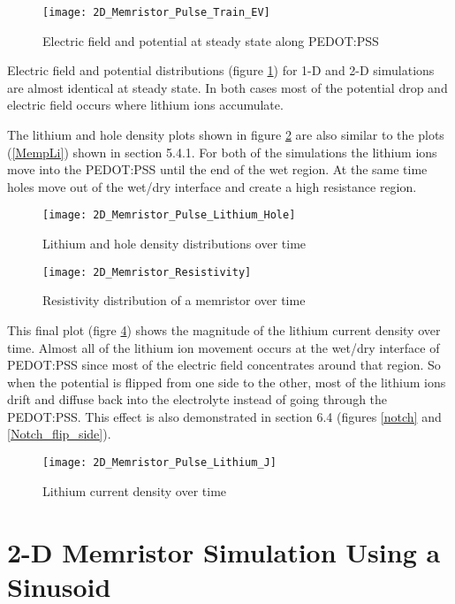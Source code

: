\begin{doublespace}
\begin{figure}[!htp]
\centering
\texttt{[image: 2D\_Memristor\_Pulse\_Train\_EV]}
\caption{Electric field and potential at steady state along PEDOT:PSS} 
\label{2D_E_V_ss}
\end{figure}

Electric field and potential distributions (figure \ref{2D_E_V_ss}) for 1-D and 2-D simulations are almost identical at steady state. In both cases most of the potential drop and electric field occurs where lithium ions accumulate.

The lithium and hole density plots shown in figure \ref{lit_hole_dist} are also similar to the plots (\ref{MempLi}) shown in section 5.4.1. For both of the simulations the lithium ions move into the PEDOT:PSS until the end of the wet region. At the same time holes move out of the wet/dry interface and create a high resistance region.

\begin{figure}[!htp]
\centering
\texttt{[image: 2D\_Memristor\_Pulse\_Lithium\_Hole]}
\caption{Lithium and hole density distributions over time} 
\label{lit_hole_dist}
\end{figure}

\begin{figure}[!htp]
\centering
\texttt{[image: 2D\_Memristor\_Resistivity]}
\caption{Resistivity distribution of a memristor over time} 
\label{2dres}
\end{figure}

This final plot (figre \ref{mag_lit_curr}) shows the magnitude of the lithium current density over time. Almost all of the lithium ion movement occurs at the wet/dry interface of PEDOT:PSS since most of the electric field concentrates around that region. So when the potential is flipped from one side to the other, most of the lithium ions drift and diffuse back into the electrolyte instead of going through the PEDOT:PSS. This effect is also demonstrated in section 6.4 (figures \ref{notch} and \ref{Notch_flip_side}). 

\begin{figure}[!htp]
\centering
\texttt{[image: 2D\_Memristor\_Pulse\_Lithium\_J]}
\caption{Lithium current density over time} 
\label{mag_lit_curr}
\end{figure}


\clearpage
\section{2-D Memristor Simulation Using a Sinusoid}


\end{doublespace}
